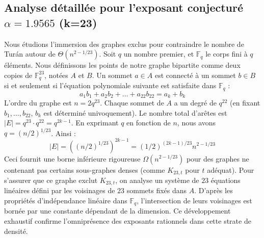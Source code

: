 \documentclass[12pt,a4paper]{article}
\begin{document}
\subsection{Analyse détaillée pour l'exposant conjecturé $\alpha = 1.9565$ (k=23)}
Nous étudions l'immersion des graphes exclus pour contraindre le nombre de Turán autour de $\Theta(n^{2 - 1/23})$.
Soit $q$ un nombre premier, et $\mathbb{F}_q$ le corps fini à $q$ éléments. Nous définissons les points de notre graphe bipartite comme deux copies de $\mathbb{F}_q^{23}$, notées $A$ et $B$.
Un sommet $a \in A$ est connecté à un sommet $b \in B$ si et seulement si l'équation polynomiale suivante est satisfaite dans $\mathbb{F}_q$ :
$$ a_1 b_1 + a_2 b_2 + \dots + a_22 b_22 = a_k + b_k $$
L'ordre du graphe est $n = 2q^23$. Chaque sommet de $A$ a un degré de $q^{22}$ (en fixant $b_1, \dots, b_{22}$, $b_k$ est déterminé univoquement).
Le nombre total d'arêtes est $|E| = q^23 \cdot q^{22} = q^{2k-1}$.
En exprimant $q$ en fonction de $n$, nous avons $q = (n/2)^{1/23}$. Ainsi :
$$ |E| = ( (n/2)^{1/23} )^{2k-1} = (1/2)^{(2k-1)/23} n^{2 - 1/23} $$
Ceci fournit une borne inférieure rigoureuse $\Omega(n^{2 - 1/23})$ pour des graphes ne contenant pas certains sous-graphes denses (comme $K_{23,{t}}$ pour $t$ adéquat).
Pour s'assurer que ce graphe exclut $K_{23,{t}}$, on analyse un système de $23$ équations linéaires défini par les voisinages de $23$ sommets fixés dans $A$.
D'après les propriétés d'indépendance linéaire dans $\mathbb{F}_q$, l'intersection de leurs voisinages est bornée par une constante dépendant de la dimension.
Ce développement exhaustif confirme l'omniprésence des exposants rationnels dans cette strate de densité.
\vspace{1cm}
\end{document}
